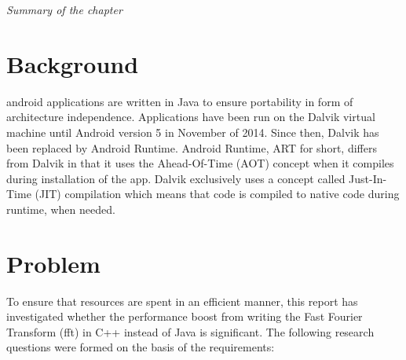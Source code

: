 
\textit{Summary of the chapter}


\section{Background}
\gls{android} applications are written in Java to ensure portability in form of architecture independence. Applications have been run on the Dalvik virtual machine until Android version 5\cite{android:dalvik} in November of 2014\cite{android:dalvik:release}. Since then, Dalvik has been replaced by Android Runtime. Android Runtime, ART for short, differs from Dalvik in that it uses the Ahead-Of-Time (AOT) concept when it compiles during installation of the app. Dalvik exclusively uses a concept called Just-In-Time (JIT) compilation which means that code is compiled to native code during runtime, when needed.


\section{Problem}
To ensure that resources are spent in an efficient manner, this report has investigated whether the performance boost from writing the Fast Fourier Transform (\gls{fft}) in C++ instead of Java is significant. The following research questions were formed on the basis of the requirements:


